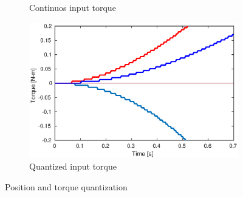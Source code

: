 \documentclass[a4paper, 10pt]{article}
\begin{document}
\begin{figure}[h!]
\begin{subfigure}[b]{0.4\textwidth}
    \caption{Continuos input torque}
    \label{fig:torque_quantized1}
  \end{subfigure}
  \begin{subfigure}[b]{0.4\textwidth}
    \centering
    \includegraphics[width=\textwidth]{Figures/torque_quantized2.eps}
    \caption{Quantized input torque}
    \label{fig:torque_quantized2}
  \end{subfigure}
  \caption{Position and torque quantization}
  \label{fig:quantization}
\end{figure}
\end{document}
